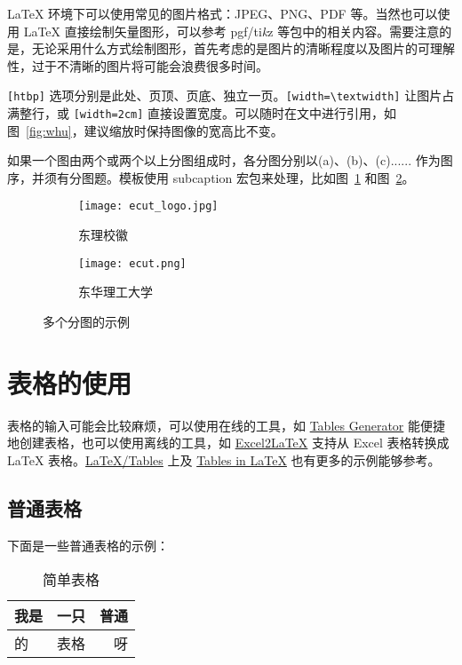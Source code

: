 \LaTeX{} 环境下可以使用常见的图片格式：JPEG、PNG、PDF 等。当然也可以使用 \LaTeX{} 直接绘制矢量图形，可以参考 pgf/ti\emph{k}z 等包中的相关内容。需要注意的是，无论采用什么方式绘制图形，首先考虑的是图片的清晰程度以及图片的可理解性，过于不清晰的图片将可能会浪费很多时间。

\verb|[htbp]| 选项分别是此处、页顶、页底、独立一页。\verb|[width=\textwidth]| 让图片占满整行，或 \verb|[width=2cm]| 直接设置宽度。可以随时在文中进行引用，如图~\ref{fig:whu}，建议缩放时保持图像的宽高比不变。

如果一个图由两个或两个以上分图组成时，各分图分别以(a)、(b)、(c)...... 作为图序，并须有分图题。模板使用 subcaption 宏包来处理，比如图~\ref{fig:subfig-a} 和图~\ref{fig:subfig-b}。

\begin{figure}[h]
  \centering
  \begin{subfigure}{0.2\textwidth}
    \texttt{[image: ecut\_logo.jpg]}
    \caption{东理校徽}
    \label{fig:subfig-a}
  \end{subfigure}\qquad
  \begin{subfigure}{0.7\textwidth}
    \texttt{[image: ecut.png]}
    \caption{东华理工大学}
    \label{fig:subfig-b}
  \end{subfigure}
  \caption{多个分图的示例}
  \label{fig:multi-image}
\end{figure}

\section{表格的使用}
表格的输入可能会比较麻烦，可以使用在线的工具，如 \href{https://www.tablesgenerator.com/}{Tables Generator} 能便捷地创建表格，也可以使用离线的工具，如 \href{https://ctan.org/pkg/excel2latex}{Excel2LaTeX} 支持从 Excel 表格转换成 \LaTeX{} 表格。\href{https://en.wikibooks.org/wiki/LaTeX/Tables}{LaTeX/Tables} 上及 \href{https://www.tug.org/pracjourn/2007-1/mori/mori.pdf}{Tables in LaTeX} 也有更多的示例能够参考。

\subsection{普通表格}
下面是一些普通表格的示例：

\begin{table}[ht]
  \centering
  \caption{简单表格}
  \label{tab:1}
  \begin{tabular}{|l|c|r|}
    \hline
    我是 & 一只 & 普通 \\
    \hline
    的   & 表格 & 呀   \\
    \hline
  \end{tabular}
\end{table}


